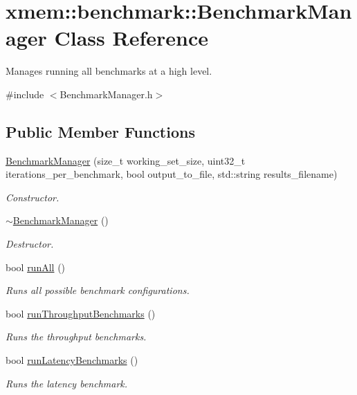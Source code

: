 \hypertarget{classxmem_1_1benchmark_1_1_benchmark_manager}{\section{xmem\-:\-:benchmark\-:\-:Benchmark\-Manager Class Reference}
\label{classxmem_1_1benchmark_1_1_benchmark_manager}
}


Manages running all benchmarks at a high level.  




{\ttfamily \#include $<$Benchmark\-Manager.\-h$>$}

\subsection*{Public Member Functions}
\begin{DoxyCompactItemize}
\item 
\hyperlink{classxmem_1_1benchmark_1_1_benchmark_manager_a1990c0e85b05764d7819b6903d495ee1}{Benchmark\-Manager} (size\-\_\-t working\-\_\-set\-\_\-size, uint32\-\_\-t iterations\-\_\-per\-\_\-benchmark, bool output\-\_\-to\-\_\-file, std\-::string results\-\_\-filename)
\begin{DoxyCompactList}\small\item\em Constructor. \end{DoxyCompactList}\item 
\hypertarget{classxmem_1_1benchmark_1_1_benchmark_manager_ab1540ca105b7e3c4f5fe96aeb59cc649}{\hyperlink{classxmem_1_1benchmark_1_1_benchmark_manager_ab1540ca105b7e3c4f5fe96aeb59cc649}{$\sim$\-Benchmark\-Manager} ()}\label{classxmem_1_1benchmark_1_1_benchmark_manager_ab1540ca105b7e3c4f5fe96aeb59cc649}

\begin{DoxyCompactList}\small\item\em Destructor. \end{DoxyCompactList}\item 
bool \hyperlink{classxmem_1_1benchmark_1_1_benchmark_manager_a7b7f4694586af20262d2f3ebe3750d86}{run\-All} ()
\begin{DoxyCompactList}\small\item\em Runs all possible benchmark configurations. \end{DoxyCompactList}\item 
bool \hyperlink{classxmem_1_1benchmark_1_1_benchmark_manager_a47b21d3d8a1e1be93e7efd35a3374b0c}{run\-Throughput\-Benchmarks} ()
\begin{DoxyCompactList}\small\item\em Runs the throughput benchmarks. \end{DoxyCompactList}\item 
bool \hyperlink{classxmem_1_1benchmark_1_1_benchmark_manager_ac515058049ec46df410e4e8e7d858019}{run\-Latency\-Benchmarks} ()
\begin{DoxyCompactList}\small\item\em Runs the latency benchmark. \end{DoxyCompactList}\end{DoxyCompactItemize}


